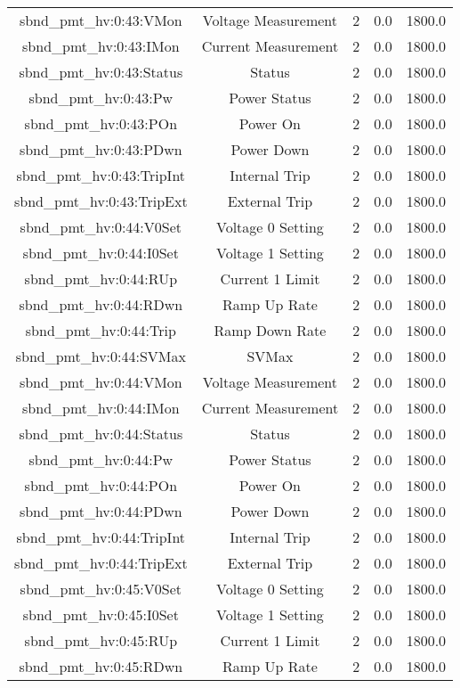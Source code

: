 \begin{center}
\begin{longtable}{c | c c c c }
sbnd\_pmt\_hv:0:43:VMon & Voltage Measurement & 2 & 0.0 & 1800.0\\ 
sbnd\_pmt\_hv:0:43:IMon & Current Measurement & 2 & 0.0 & 1800.0\\ 
sbnd\_pmt\_hv:0:43:Status & Status & 2 & 0.0 & 1800.0\\ 
sbnd\_pmt\_hv:0:43:Pw & Power Status & 2 & 0.0 & 1800.0\\ 
sbnd\_pmt\_hv:0:43:POn & Power On & 2 & 0.0 & 1800.0\\ 
sbnd\_pmt\_hv:0:43:PDwn & Power Down & 2 & 0.0 & 1800.0\\ 
sbnd\_pmt\_hv:0:43:TripInt & Internal Trip & 2 & 0.0 & 1800.0\\ 
sbnd\_pmt\_hv:0:43:TripExt & External Trip & 2 & 0.0 & 1800.0\\ 
sbnd\_pmt\_hv:0:44:V0Set & Voltage 0 Setting & 2 & 0.0 & 1800.0\\ 
sbnd\_pmt\_hv:0:44:I0Set & Voltage 1 Setting & 2 & 0.0 & 1800.0\\ 
sbnd\_pmt\_hv:0:44:RUp & Current 1 Limit & 2 & 0.0 & 1800.0\\ 
sbnd\_pmt\_hv:0:44:RDwn & Ramp Up Rate & 2 & 0.0 & 1800.0\\ 
sbnd\_pmt\_hv:0:44:Trip & Ramp Down Rate & 2 & 0.0 & 1800.0\\ 
sbnd\_pmt\_hv:0:44:SVMax & SVMax & 2 & 0.0 & 1800.0\\ 
sbnd\_pmt\_hv:0:44:VMon & Voltage Measurement & 2 & 0.0 & 1800.0\\ 
sbnd\_pmt\_hv:0:44:IMon & Current Measurement & 2 & 0.0 & 1800.0\\ 
sbnd\_pmt\_hv:0:44:Status & Status & 2 & 0.0 & 1800.0\\ 
sbnd\_pmt\_hv:0:44:Pw & Power Status & 2 & 0.0 & 1800.0\\ 
sbnd\_pmt\_hv:0:44:POn & Power On & 2 & 0.0 & 1800.0\\ 
sbnd\_pmt\_hv:0:44:PDwn & Power Down & 2 & 0.0 & 1800.0\\ 
sbnd\_pmt\_hv:0:44:TripInt & Internal Trip & 2 & 0.0 & 1800.0\\ 
sbnd\_pmt\_hv:0:44:TripExt & External Trip & 2 & 0.0 & 1800.0\\ 
sbnd\_pmt\_hv:0:45:V0Set & Voltage 0 Setting & 2 & 0.0 & 1800.0\\ 
sbnd\_pmt\_hv:0:45:I0Set & Voltage 1 Setting & 2 & 0.0 & 1800.0\\ 
sbnd\_pmt\_hv:0:45:RUp & Current 1 Limit & 2 & 0.0 & 1800.0\\ 
sbnd\_pmt\_hv:0:45:RDwn & Ramp Up Rate & 2 & 0.0 & 1800.0\\ 

\end{longtable}
\end{center}
